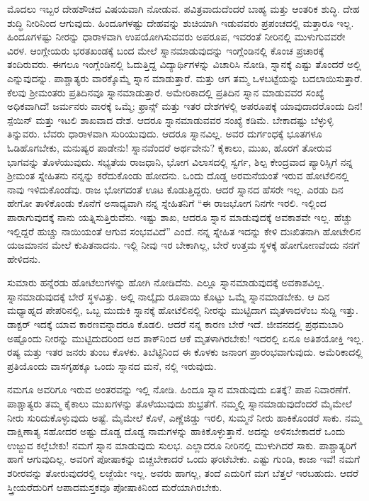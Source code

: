 ಮೊದಲು ಇಬ್ಬರ ದೇಹಶೌಚದ ವಿಷಯವಾಗಿ ನೋಡುವ. ಪವಿತ್ರವಾದುದೆಂದರೆ ಬಾಹ್ಯ ಮತ್ತು ಆಂತರಿಕ ಶುದ್ಧಿ. ದೇಹ ಶುದ್ಧಿ ನೀರಿನಿಂದ ಆಗುವುದು. ಹಿಂದೂಗಳಷ್ಟು ದೇಹವನ್ನು ಶುಚಿಯಾಗಿ ಇಡುವವರು ಪ್ರಪಂಚದಲ್ಲಿ ಮತ್ತಾರೂ ಇಲ್ಲ. ಹಿಂದೂಗಳಷ್ಟು ನೀರನ್ನು ಧಾರಾಳವಾಗಿ ಉಪಯೋಗಿಸುವವರು ಅಪರೂಪ, ಇವರಂತೆ ನೀರಿನಲ್ಲಿ ಮುಳುಗುವವರೇ ವಿರಳ. ಆಂಗ್ಲೇಯರು ಭರತಖಂಡಕ್ಕೆ ಬಂದ ಮೇಲೆ ಸ್ನಾನಮಾಡುವುದನ್ನು ಇಂಗ್ಲೆಂಡಿನಲ್ಲಿ ಕೊಂಚ ಪ್ರಚಾರಕ್ಕೆ ತಂದಿರುವರು. ಈಗಲೂ ಇಂಗ್ಲೆಂಡಿನಲ್ಲಿ ಓದುತ್ತಿದ್ದ ವಿದ್ಯಾರ್ಥಿಗಳನ್ನು ವಿಚಾರಿಸಿ ನೋಡಿ, ಸ್ನಾನಕ್ಕೆ ಎಷ್ಟು ತೊಂದರೆ ಅಲ್ಲಿ ಎನ್ನುವುದನ್ನು. ಪಾಶ್ಚಾತ್ಯರು ವಾರಕ್ಕೊಮ್ಮೆ ಸ್ನಾನ ಮಾಡುತ್ತಾರೆ. ಮತ್ತು ಆಗ ತಮ್ಮ ಒಳಬಟ್ಟೆಯನ್ನು ಬದಲಾಯಿಸುತ್ತಾರೆ. ಕೆಲವು ಶ‍್ರೀಮಂತರು ಪ್ರತಿದಿನವೂ ಸ್ನಾನಮಾಡುತ್ತಾರೆ. ಅಮೇರಿಕಾದಲ್ಲಿ ಪ್ರತಿದಿನ ಸ್ನಾನ ಮಾಡುವವರ ಸಂಖ್ಯೆ ಅಧಿಕವಾಗಿದೆ! ಜರ್ಮನರು ವಾರಕ್ಕೆ ಒಮ್ಮೆ; ಫ್ರಾನ್ಸ್​ ಮತ್ತು ಇತರ ದೇಶಗಳಲ್ಲಿ ಅಪರೂಪಕ್ಕೆ ಯಾವುದಾದರೊಂದು ದಿನ! ಸ್ಪೆಯಿನ್​ ಮತ್ತು ಇಟಲಿ ಶಾಖವಾದ ದೇಶ. ಆದರೂ ಸ್ನಾನಮಾಡುವವರ ಸಂಖ್ಯೆ ಕಡಿಮೆ. ಬೇಕಾದಷ್ಟು ಬೆಳ್ಳುಳ್ಳಿ ತಿನ್ನುವರು. ಬೆವರು ಧಾರಾಳವಾಗಿ ಸುರಿಯುವುದು. ಆದರೂ ಸ್ನಾನವಿಲ್ಲ. ಅವರ ದುರ್ಗಂಧಕ್ಕೆ ಭೂತಗಳೂ ಓಡಿಹೊಗಬೇಕು, ಮನುಷ್ಯರ ಪಾಡೇನು! ಸ್ನಾನವೆಂದರೆ ಅರ್ಥವೇನು? ಕೈಕಾಲು, ಮುಖ, ಹೊರಗೆ ತೋರುವ ಭಾಗವನ್ನು ತೊಳೆಯುವುದು. ಸಭ್ಯತೆಯ ರಾಜಧಾನಿ, ಭೋಗ ವಿಲಾಸದಲ್ಲಿ ಸ್ವರ್ಗ, ಶಿಲ್ಪ ಕೇಂದ್ರವಾದ ಪ್ಯಾರಿಸ್ಸಿಗೆ ನನ್ನ ಶ‍್ರೀಮಂತ ಸ್ನೇಹಿತನು ನನ್ನನ್ನು ಕರೆದುಕೊಂಡು ಹೋದನು. ಒಂದು ದೊಡ್ಡ ಅರಮನೆಯಂತೆ ಇರುವ ಹೋಟೆಲಿನಲ್ಲಿ ನಾವು ಇಳಿದುಕೊಂಡೆವು. ರಾಜ ಭೋಗದಂತೆ ಊಟ ಕೊಡುತ್ತಿದ್ದರು. ಆದರೆ ಸ್ನಾನದ ಹೆಸರೇ ಇಲ್ಲ. ಎರಡು ದಿನ ಹೇಗೋ ತಾಳಿಕೊಂಡು ಕೊನೆಗೆ ಅಸಾಧ್ಯವಾಗಿ ನನ್ನ ಸ್ನೇಹಿತನಿಗೆ “ಈ ರಾಜಭೋಗ ನಿನಗೇ ಇರಲಿ. ಇಲ್ಲಿಂದ ಪಾರಾಗುವುದಕ್ಕೆ ನಾನು ಯತ್ನಿಸುತ್ತಿರುವೆನು. ಇಷ್ಟು ಶಾಖ, ಆದರೂ ಸ್ನಾನ ಮಾಡುವುದಕ್ಕೆ ಅವಕಾಶವೇ ಇಲ್ಲ. ಹೆಚ್ಚು ಇಲ್ಲಿದ್ದರೆ ಹುಚ್ಚು ನಾಯಿಯಂತೆ ಆಗುವ ಸಂಭವವಿದೆ” ಎಂದೆ. ನನ್ನ ಸ್ನೇಹಿತ ಇದನ್ನು ಕೇಳಿ ದುಃಖಿತನಾಗಿ ಹೋಟೇಲಿನ ಯಜಮಾನನ ಮೇಲೆ ಕುಪಿತನಾದನು. ಇಲ್ಲಿ ನೀವು ಇರ ಬೇಕಾಗಿಲ್ಲ, ಬೇರೆ ಉತ್ತಮ ಸ್ಥಳಕ್ಕೆ ಹೋಗೋಣವೆಂದು ನನಗೆ ಹೇಳಿದನು.

ಸುಮಾರು ಹನ್ನೆರಡು ಹೋಟೆಲುಗಳನ್ನು ಹೋಗಿ ನೋಡಿದೆನು. ಎಲ್ಲೂ ಸ್ನಾನಮಾಡು\break ವುದಕ್ಕೆ ಅವಕಾಶವಿಲ್ಲ. ಸ್ನಾನಮಾಡುವುದಕ್ಕೆ ಬೇರೆ ಸ್ಥಳವಿತ್ತು. ಅಲ್ಲಿ ನಾಲ್ಕೈದು ರೂಪಾಯಿ ಕೊಟ್ಟು ಒಮ್ಮೆ ಸ್ನಾನಮಾಡಬೇಕು. ಆ ದಿನ ಮಧ್ಯಾಹ್ನದ ಪೇಪರಿನಲ್ಲಿ, ಒಬ್ಬ ಮುದುಕಿ ಸ್ನಾನಕ್ಕೆ ಹೋಟೆಲಿನಲ್ಲಿ ನೀರನ್ನು ಮುಟ್ಟಿದಾಗ ಮೃತಳಾದಳೆಂಬ ಸುದ್ದಿ ಇತ್ತು. ಡಾಕ್ಟರ್​ ಇದಕ್ಕೆ ಯಾವ ಕಾರಣವನ್ನಾದರೂ ಕೊಡಲಿ. ಆದರೆ ನನ್ನ ಕಾರಣ ಬೇರೆ ಇದೆ. ಜೀವನದಲ್ಲಿ ಪ್ರಥಮಬಾರಿ ಅಷ್ಟೊಂದು ನೀರನ್ನು ಮುಟ್ಟಿದುದರಿಂದ ಆದ ಶಾಕ್​ನಿಂದ ಆಕೆ ಮೃತಳಾಗಿರಬೇಕು! ಇದರಲ್ಲಿ ಏನೂ ಅತಿಶಯೋಕ್ತಿ ಇಲ್ಲ. ರಷ್ಯ ಮತ್ತು ಇತರ ಜನರು ತುಂಬ ಕೊಳಕು. ತಿಬೆಟ್ಟಿನಿಂದ ಈ ಕೊಳಕು ಜನಾಂಗ ಪ್ರಾರಂಭವಾಗುವುದು. ಅಮೆರಿಕಾದಲ್ಲಿ ಪ್ರತಿಯೊಂದು ವಾಸಗೃಹಕ್ಕೂ ಒಂದು ಸ್ನಾನದ ಮನೆ, ನಲ್ಲಿ ಇರುವುದು.

ನಮಗೂ ಅವರಿಗೂ ಇರುವ ಅಂತರವನ್ನು ಇಲ್ಲಿ ನೋಡಿ. ಹಿಂದೂ ಸ್ನಾನ ಮಾಡುವುದು ಏತಕ್ಕೆ? ಪಾಪ ನಿವಾರಣೆಗೆ. ಪಾಶ್ಚಾತ್ಯರು ತಮ್ಮ ಕೈಕಾಲು ಮುಖಗಳನ್ನು ತೊಳೆಯು\break ವುದು ಶುಭ್ರತೆಗೆ. ನಮ್ಮಲ್ಲಿ ಸ್ನಾನಮಾಡುವುದೆಂದರೆ ಮೈಮೇಲೆ ನೀರು ಸುರಿದುಕೊಳ್ಳುವುದು ಅಷ್ಟೆ. ಮೈಮೇಲೆ ಕೊಳೆ, ಎಣ್ಣೆಜಿಡ್ಡು ಇರಲಿ, ಸುಮ್ಮನೆ ನೀರು ಹಾಕಿಕೊಂಡರೆ ಸಾಕು. ನಮ್ಮ ದಾಕ್ಷಿಣಾತ್ಯ ಸಹೋದರ ಅಷ್ಟು ದೊಡ್ಡ ದೊಡ್ಡ ನಾಮಗಳನ್ನು ಹಾಕಿಕೊಳ್ಳುತ್ತಾನೆ. ಅದನ್ನು ಅಳಿಸಬೇಕಾದರೆ ಒಂದು ಉಜ್ಜುವ ಕಲ್ಲೆಬೇಕು! ನಮಗೆ ಸ್ನಾನ ಮಾಡುವುದು ಸುಲಭ. ಎಲ್ಲಾದರೂ ನೀರಿನಲ್ಲಿ ಮುಳುಗಿದರೆ ಸಾಕು. ಪಾಶ್ಚಾತ್ಯರಿಗೆ ಹಾಗೆ ಆಗುವುದಿಲ್ಲ. ಅವರಿಗೆ ಪೋಷಾಕನ್ನು ಬಿಚ್ಚಬೇಕಾದರೆ ಒಂದು ಘಂಟೆಬೇಕು. ಎಷ್ಟು ಗುಂಡಿ, ಕಾಜಾ ಇವೆ! ನಮಗೆ ಶರೀರವನ್ನು ತೋರುವುದರಲ್ಲಿ ಲಜ್ಜೆಯೇ ಇಲ್ಲ. ಅವರು ಹಾಗಲ್ಲ, ತಂದೆ ಎದುರಿಗೆ ಮಗ ಬೆತ್ತಲೆ ಇರಬಹುದು. ಆದರೆ ಸ್ತ್ರೀಯರೆದುರಿಗೆ ಆಪಾದಮಸ್ತಕವೂ ಪೋಷಾಕಿನಿಂದ ಮರೆಯಾಗಿರಬೇಕು.

